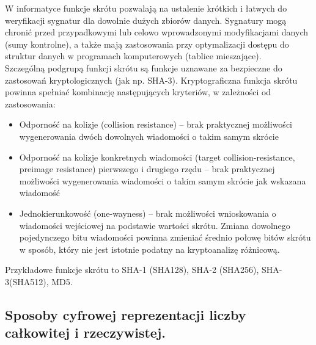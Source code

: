 \documentclass[a4paper,12pt,oneside]{book}
\begin{document}
W informatyce funkcje skrótu pozwalają na ustalenie krótkich i łatwych do weryfikacji sygnatur dla dowolnie dużych zbiorów danych. Sygnatury mogą chronić przed przypadkowymi lub celowo wprowadzonymi modyfikacjami danych (sumy kontrolne), a także mają zastosowania przy optymalizacji dostępu do struktur danych w programach komputerowych (tablice mieszające).\\

Szczególną podgrupą funkcji skrótu są funkcje uznawane za bezpieczne do zastosowań kryptologicznych (jak np. SHA-3). Kryptograficzna funkcja skrótu powinna spełniać kombinację następujących kryteriów, w zależności od zastosowania:\\
\begin{itemize}
	\item Odporność na kolizje (collision resistance) – brak praktycznej możliwości wygenerowania dwóch dowolnych wiadomości o takim samym skrócie
	\item Odporność na kolizje konkretnych wiadomości (target collision-resistance, preimage resistance) pierwszego i drugiego rzędu – brak praktycznej możliwości wygenerowania wiadomości o takim samym skrócie jak wskazana wiadomość
	\item Jednokierunkowość (one-wayness) – brak możliwości wnioskowania o wiadomości wejściowej na podstawie wartości skrótu. Zmiana dowolnego pojedynczego bitu wiadomości powinna zmieniać średnio połowę bitów skrótu w sposób, który nie jest istotnie podatny na kryptoanalizę różnicową.
\end{itemize}

Przykładowe funkcje skrótu to SHA-1 (SHA128), SHA-2 (SHA256), SHA-3(SHA512), MD5.

\setcounter{subsection}{5}
\subsection{Sposoby cyfrowej reprezentacji liczby całkowitej i rzeczywistej.}

\setcounter{subsection}{32}
\end{document}
